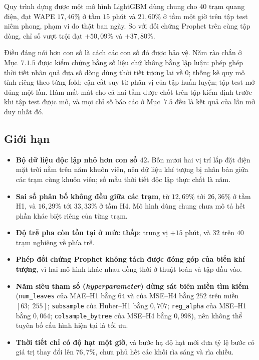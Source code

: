 Quy trình dựng được một mô hình LightGBM dùng chung cho $40$ trạm quang điện, đạt WAPE
$17{,}46\%$ ở tầm $15$ phút và $21{,}60\%$ ở tầm một giờ trên tập test niêm phong, phạm vi đo
thật ban ngày. So với đối chứng Prophet trên cùng tập dòng, chỉ số vượt trội đạt $+50{,}09\%$
và $+37{,}80\%$.

Điều đáng nói hơn con số là cách các con số đó được bảo vệ. Năm rào chắn ở Mục~$7.1.5$ được kiểm
chứng bằng số liệu chứ không bằng lập luận: phép ghép thời tiết nhân quả đưa số dòng dùng thời
tiết tương lai về $0$; thống kê quy mô tính riêng theo từng fold; cận cắt suy từ phân vị của
tập huấn luyện; tập test mở đúng một lần. Hàm mất mát cho cả hai tầm được chốt trên tập kiểm
định trước khi tập test được mở, và mọi chỉ số báo cáo ở Mục~$7.5$ đều là kết quả của lần mở
duy nhất đó.

\FloatBarrier
\subsection{Giới hạn}

\begin{itemize}
    \item \textbf{Bộ dữ liệu độc lập nhỏ hơn con số $42$.} Bốn mươi hai vị trí lắp đặt điện mặt trời nằm trên
    năm khuôn viên, nên dữ liệu khí tượng bị nhân bản giữa các trạm cùng khuôn viên; số mẫu
    thời tiết độc lập thực chất là năm.
    \item \textbf{Sai số phân bố không đều giữa các trạm}, từ $12{,}69\%$ tới $26{,}36\%$ ở
    tầm H1, và $16{,}29\%$ tới $33{,}33\%$ ở tầm H4. Mô hình dùng chung chưa mô tả hết phần khác
    biệt riêng của từng trạm.
    \item \textbf{Độ trễ pha còn tồn tại ở mức thấp}: trung vị $+15$ phút, và $32$ trên $40$
    trạm nghiêng về phía trễ.
    \item \textbf{Phép đối chứng Prophet không tách được đóng góp của biến khí tượng}, vì hai
    mô hình khác nhau đồng thời ở thuật toán và tập đầu vào.
    \item \textbf{Năm siêu tham số (\textit{hyperparameter}) dừng sát biên miền tìm kiếm}
    (\texttt{num\_leaves} của MAE--H1 bằng $64$ và của MSE--H4 bằng $252$ trên miền
    $[63;\ 255]$; \texttt{subsample} của Huber--H1 bằng $0{,}707$; \texttt{reg\_alpha} của
    MSE--H1 bằng $0{,}064$; \texttt{colsample\_bytree} của MSE--H4 bằng $0{,}998$), nên không
    thể tuyên bố cấu hình hiện tại là tối ưu.
    \item \textbf{Thời tiết chỉ có độ hạt một giờ}, và bước hạ độ hạt mới đưa tỷ lệ
    bước có giá trị thay đổi lên $76{,}7\%$, chưa phủ hết các khối rìa sáng và rìa chiều.
\end{itemize}


